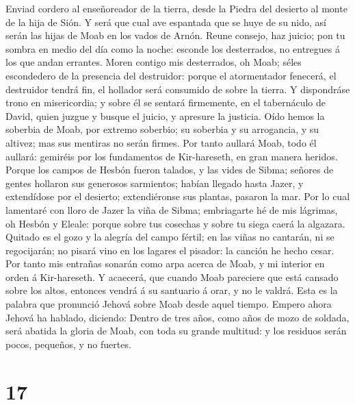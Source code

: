 Enviad cordero al enseñoreador de la tierra, desde la
Piedra del desierto al monte de la hija de Sión.  Y será que
cual ave espantada que se huye de su nido, así serán las hijas de Moab
en los vados de Arnón.  Reune consejo, haz juicio; pon tu
sombra en medio del día como la noche: esconde los desterrados, no
entregues á los que andan errantes.  Moren contigo mis
desterrados, oh Moab; séles escondedero de la presencia del destruidor:
porque el atormentador fenecerá, el destruidor tendrá fin, el hollador
será consumido de sobre la tierra.  Y dispondráse trono en
misericordia; y sobre él se sentará firmemente, en el tabernáculo de
David, quien juzgue y busque el juicio, y apresure la justicia.
 Oído hemos la soberbia de Moab, por extremo soberbio; su
soberbia y su arrogancia, y su altivez; mas sus mentiras no serán
firmes.  Por tanto aullará Moab, todo él aullará: gemiréis
por los fundamentos de Kir-hareseth, en gran manera heridos.
 Porque los campos de Hesbón fueron talados, y las vides de
Sibma; señores de gentes hollaron sus generosos sarmientos; habían
llegado hasta Jazer, y extendídose por el desierto; extendiéronse sus
plantas, pasaron la mar.  Por lo cual lamentaré con lloro de
Jazer la viña de Sibma; embriagarte hé de mis lágrimas, oh Hesbón y
Eleale: porque sobre tus cosechas y sobre tu siega caerá la algazara.
 Quitado es el gozo y la alegría del campo fértil; en las
viñas no cantarán, ni se regocijarán; no pisará vino en los lagares el
pisador: la canción he hecho cesar.  Por tanto mis entrañas
sonarán como arpa acerca de Moab, y mi interior en orden á Kir-hareseth.
 Y acaecerá, que cuando Moab pareciere que está cansado
sobre los altos, entonces vendrá á su santuario á orar, y no le valdrá.
 Esta es la palabra que pronunció Jehová sobre Moab desde
aquel tiempo.  Empero ahora Jehová ha hablado, diciendo:
Dentro de tres años, como años de mozo de soldada, será abatida la
gloria de Moab, con toda su grande multitud: y los residuos serán pocos,
pequeños, y no fuertes.

\hypertarget{section-16}{%
\section{17}\label{section-16}}

